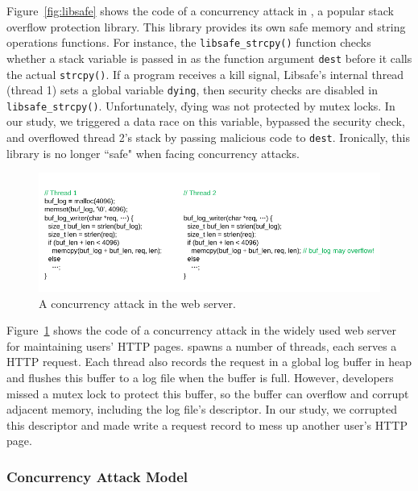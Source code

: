 Figure~\ref{fig:libsafe} shows the code of a concurrency attack in 
\libsafe, a popular stack overflow protection library. This library 
provides its own safe memory and string operations functions. For instance, the 
\texttt{libsafe\_strcpy()} function checks whether a stack variable is passed 
in as the function argument \texttt{dest} before it calls the actual 
\texttt{strcpy()}. If a program receives a kill signal, Libsafe's internal 
thread (thread 1) sets a global variable \texttt{dying}, then security checks 
are disabled in \texttt{libsafe\_strcpy()}. Unfortunately, \v{dying} was not 
protected by mutex locks. In our study, we triggered a data race on this 
variable, bypassed the security check, and overflowed thread 2's stack by 
passing malicious code to \texttt{dest}. Ironically, this \libsafe library is 
no longer ``safe" when facing concurrency attacks.

\begin{figure}[h]
\centering
\includegraphics[width=0.8\columnwidth]{figures/apache}
\vspace{-.05in}
\caption{{A concurrency attack in the \apache web server.}} \label{fig:apache}
\vspace{-.15in}
\end{figure}

Figure~\ref{fig:apache} shows the code of a concurrency attack in 
the widely used \apache web server for maintaining users' HTTP pages. \apache 
spawns a number of threads, each serves a HTTP request. Each thread also 
records the request in a global log buffer in heap and flushes this buffer to a 
log file when the buffer is full. However, developers missed a mutex lock to 
protect this buffer, so the buffer can overflow and corrupt adjacent memory, 
including the log file's descriptor. In our study, we corrupted this descriptor 
and made \apache write a request record to mess up another user's HTTP page.



\vspace{-.15in}\subsubsection{Concurrency Attack Model} 
\label{sec:attack-phase}\vspace{-.075in}

